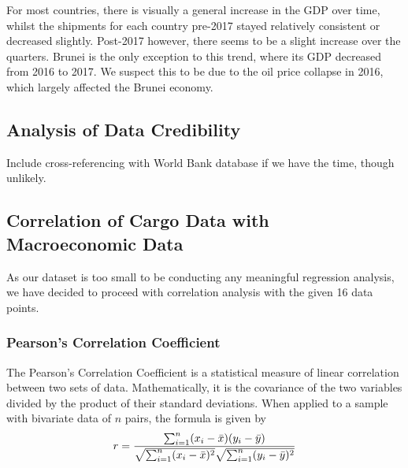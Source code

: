 \documentclass{article}
\begin{document}
\noindent For most countries, there is visually a general increase in the GDP over time, whilst the shipments for each country pre-2017 stayed relatively consistent or decreased slightly. Post-2017 however, there seems to be a slight increase over the quarters. Brunei is the only exception to this trend, where its GDP decreased from 2016 to 2017. We suspect this to be due to the oil price collapse in 2016, which largely affected the Brunei economy. 

\newpage




\subsection{Analysis of Data Credibility}
Include cross-referencing with World Bank database if we have the time, though unlikely.

\subsection{Correlation of Cargo Data with Macroeconomic Data}

As our dataset is too small to be conducting any meaningful regression analysis, we have decided to proceed with correlation analysis with the given 16 data points. 

\subsubsection{Pearson's Correlation Coefficient}
The Pearson's Correlation Coefficient is a statistical measure of linear correlation between two sets of data. Mathematically, it is the covariance of the two variables divided by the product of their standard deviations. When applied to a sample with bivariate data of $n$ pairs, the formula is given by \\

\begin{equation}
    r = \frac{ \sum_{i=1}^{n}(x_i-\bar{x})(y_i-\bar{y}) }{%
        \sqrt{\sum_{i=1}^{n}(x_i-\bar{x})^2}\sqrt{\sum_{i=1}^{n}(y_i-\bar{y})^2}}
\end{equation} \\
\end{document}
